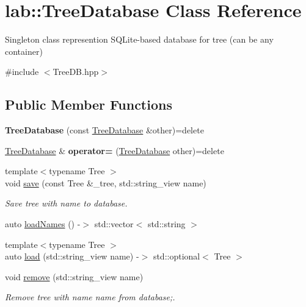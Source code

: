 \hypertarget{classlab_1_1TreeDatabase}{}\section{lab\+:\+:Tree\+Database Class Reference}
\label{classlab_1_1TreeDatabase}


Singleton class represention S\+Q\+Lite-\/based database for tree (can be any container)  




{\ttfamily \#include $<$Tree\+D\+B.\+hpp$>$}

\subsection*{Public Member Functions}
\begin{DoxyCompactItemize}
\item 
\mbox{\label{classlab_1_1TreeDatabase_ae95a7773c49745b73e42719762cc2473}} 
{\bfseries Tree\+Database} (const \hyperlink{classlab_1_1TreeDatabase}{Tree\+Database} \&other)=delete
\item 
\mbox{\label{classlab_1_1TreeDatabase_ad203ea6aff9ad9538599dc6bd49168d1}} 
\hyperlink{classlab_1_1TreeDatabase}{Tree\+Database} \& {\bfseries operator=} (\hyperlink{classlab_1_1TreeDatabase}{Tree\+Database} other)=delete
\item 
\mbox{\label{classlab_1_1TreeDatabase_adae6b9244ea8156fe2ca5895839b0a83}} 
{\footnotesize template$<$typename Tree $>$ }\\void \hyperlink{classlab_1_1TreeDatabase_adae6b9244ea8156fe2ca5895839b0a83}{save} (const Tree \&\+\_\+tree, std\+::string\+\_\+view name)
\begin{DoxyCompactList}\small\item\em Save tree with name to database. \end{DoxyCompactList}\item 
auto \hyperlink{classlab_1_1TreeDatabase_ad465665c67abac43de6eac1820e1320f}{load\+Names} () -\/$>$ std\+::vector$<$ std\+::string $>$
\item 
{\footnotesize template$<$typename Tree $>$ }\\auto \hyperlink{classlab_1_1TreeDatabase_a9e8daa58f69152466d19cae774c073f1}{load} (std\+::string\+\_\+view name) -\/$>$ std\+::optional$<$ Tree $>$
\item 
\mbox{\label{classlab_1_1TreeDatabase_a789018a165caca390c3df533b7ea243b}} 
void \hyperlink{classlab_1_1TreeDatabase_a789018a165caca390c3df533b7ea243b}{remove} (std\+::string\+\_\+view name)
\begin{DoxyCompactList}\small\item\em Remove tree with name name from database;. \end{DoxyCompactList}\end{DoxyCompactItemize}
